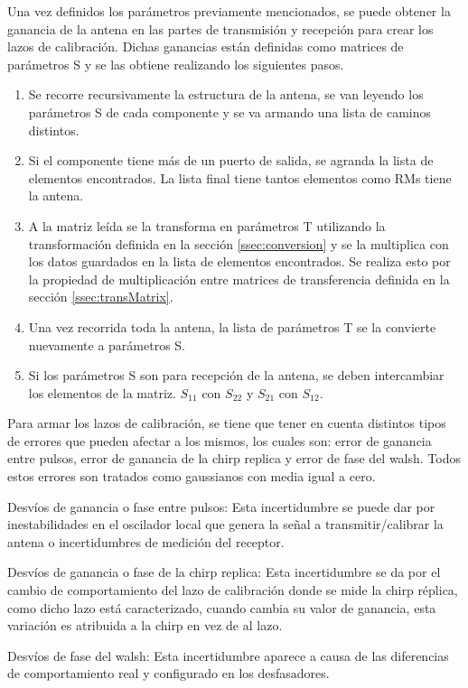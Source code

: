 Una vez definidos los parámetros previamente mencionados, se puede obtener la ganancia de la antena en las partes de 
transmisión y recepción para crear los lazos de calibración. Dichas ganancias están definidas como matrices de parámetros
S y se las obtiene realizando los siguientes pasos.

\begin{enumerate}
	\item Se recorre recursivamente la estructura de la antena, se van leyendo los parámetros S de cada componente y se va 
		armando una lista de caminos distintos.
	\item Si el componente tiene más de un puerto de salida, se agranda la lista de elementos encontrados. La lista final tiene 
		tantos elementos como RMs tiene la antena.
	\item A la matriz leída se la transforma en parámetros T utilizando la transformación definida en la sección 
		\ref{ssec:conversion} y se la multiplica con los datos guardados en la lista de elementos encontrados. Se realiza esto 
		por la propiedad de multiplicación entre matrices de transferencia definida en la sección \ref{ssec:transMatrix}.
	\item Una vez recorrida toda la antena, la lista de parámetros T se la convierte nuevamente a parámetros S.
	\item Si los parámetros S son para recepción de la antena, se deben intercambiar los elementos de la matriz. $S_{11}$ con 
		$S_{22}$ y $S_{21}$ con $S_{12}$.
\end{enumerate}

Para armar los lazos de calibración, se tiene que tener en cuenta distintos tipos de errores que pueden afectar a los mismos, 
los cuales son: error de ganancia entre pulsos, error de ganancia de la chirp replica y error de fase del walsh. Todos estos 
errores son tratados como gaussianos con media igual a cero.

Desvíos de ganancia o fase entre pulsos: Esta incertidumbre se puede dar por inestabilidades en el oscilador local que genera 
la señal a transmitir/calibrar la antena o incertidumbres de medición del receptor.

Desvíos de ganancia o fase de la chirp replica: Esta incertidumbre se da por el cambio de comportamiento del lazo de 
calibración donde se mide la chirp réplica, como dicho lazo está caracterizado, cuando cambia su valor de ganancia, esta 
variación es atribuida a la chirp en vez de al lazo.

Desvíos de fase del walsh: Esta incertidumbre aparece a causa de las diferencias de comportamiento real y configurado en los 
desfasadores. 

